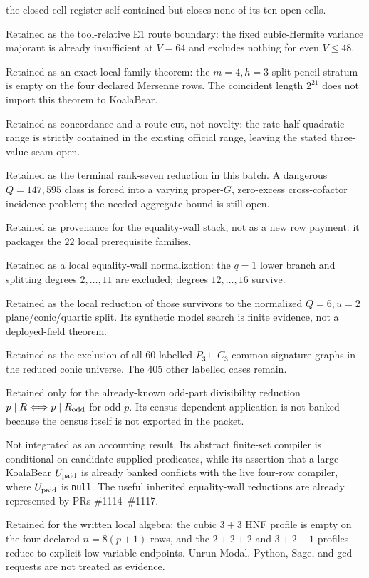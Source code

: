 \documentclass[11pt]{article}
\begin{document}
\begin{description}
  the closed-cell register self-contained but closes none of its ten open
  cells.
\item[PR \#1110.] Retained as the tool-relative E1 route boundary: the fixed
  cubic-Hermite variance majorant is already insufficient at \(V=64\) and
  excludes nothing for even \(V\le48\).
\item[PR \#1111.] Retained as an exact local family theorem: the
  \(m=4,h=3\) split-pencil stratum is empty on the four declared Mersenne rows.
  The coincident length \(2^{21}\) does not import this theorem to KoalaBear.
\item[PR \#1112.] Retained as concordance and a route cut, not novelty:
  the rate-half quadratic range is strictly contained in the existing official
  range, leaving the stated three-value seam open.
\item[PR \#1113.] Retained as the terminal rank-seven reduction in this batch.
  A dangerous \(Q=147{,}595\) class is forced into a varying proper-\(G\),
  zero-excess cross-cofactor incidence problem; the needed aggregate bound is
  still open.
\item[PR \#1114.] Retained as provenance for the equality-wall stack, not as a
  new row payment: it packages the \(22\) local prerequisite families.
\item[PR \#1115.] Retained as a local equality-wall normalization: the
  \(q=1\) lower branch and splitting degrees \(2,\ldots,11\) are excluded;
  degrees \(12,\ldots,16\) survive.
\item[PR \#1116.] Retained as the local reduction of those survivors to the
  normalized \(Q=6,u=2\) plane/conic/quartic split.  Its synthetic model search
  is finite evidence, not a deployed-field theorem.
\item[PR \#1117.] Retained as the exclusion of all \(60\) labelled
  \(P_3\sqcup C_3\) common-signature graphs in the reduced conic universe.
  The \(405\) other labelled cases remain.
\item[PR \#1118.] Retained only for the already-known odd-part divisibility
  reduction \(p\mid R\Longleftrightarrow p\mid R_{\rm odd}\) for odd \(p\).
  Its census-dependent application is not banked because the census itself is
  not exported in the packet.
\item[PR \#1119.] Not integrated as an accounting result.  Its abstract
  finite-set compiler is conditional on candidate-supplied predicates, while
  its assertion that a large KoalaBear \(U_{\rm paid}\) is already banked
  conflicts with the live four-row compiler, where \(U_{\rm paid}\) is
  \texttt{null}.  The useful inherited equality-wall reductions are already
  represented by PRs \#1114--\#1117.
\item[PR \#1120.] Retained for the written local algebra: the cubic
  \(3+3\) HNF profile is empty on the four declared \(n=8(p+1)\) rows, and the
  \(2+2+2\) and \(3+2+1\) profiles reduce to explicit low-variable endpoints.
  Unrun Modal, Python, Sage, and gcd requests are not treated as evidence.
\end{description}
\end{document}
